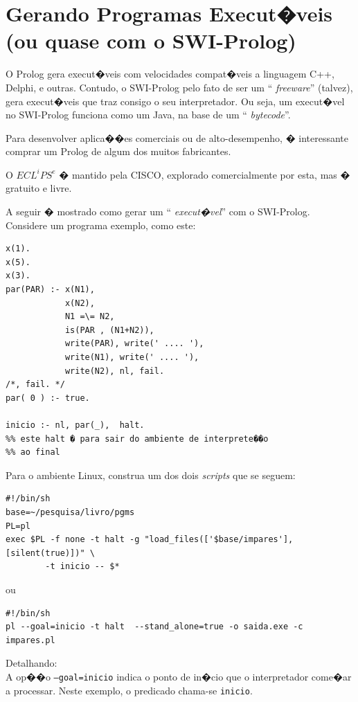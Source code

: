 \documentclass[final,a4paper]{article}
\begin{document}
\section{Gerando Programas Execut�veis (ou quase
com o SWI-Prolog)}

 O Prolog gera execut�veis com velocidades
compat�veis a linguagem C++, Delphi, e outras.
Contudo, o SWI-Prolog pelo fato de ser um ``{\em
freeware}'' (talvez), gera execut�veis que traz
consigo o seu interpretador. Ou seja, um
execut�vel no SWI-Prolog
funciona como um Java, na base de um ``{\em
bytecode}''. 


 Para desenvolver aplica��es
comerciais ou de alto-desempenho, � interessante comprar
um Prolog de algum dos muitos fabricantes.

 O $ECL^iPS^e$ � mantido pela CISCO, explorado
comercialmente por esta, mas � gratuito e livre.

\newpage
{} A seguir � mostrado como gerar um ``{\em
execut�vel}'' com o SWI-Prolog. Considere um
programa exemplo, como este:
\begin{verbatim}
x(1).
x(5).
x(3).
par(PAR) :- x(N1),
            x(N2),
            N1 =\= N2,
            is(PAR , (N1+N2)),
            write(PAR), write(' .... '), 
            write(N1), write(' .... '),
            write(N2), nl, fail.
/*, fail. */
par( 0 ) :- true.

inicio :- nl, par(_),  halt.
%% este halt � para sair do ambiente de interprete��o
%% ao final
\end{verbatim}

\newpage
Para o ambiente Linux, construa um dos dois {\em scripts} \/ que se seguem:
{\small
\begin{verbatim}
#!/bin/sh
base=~/pesquisa/livro/pgms
PL=pl
exec $PL -f none -t halt -g "load_files(['$base/impares'],[silent(true)])" \
        -t inicio -- $*
\end{verbatim}
}

ou

{\small
\begin{verbatim}
#!/bin/sh
pl --goal=inicio -t halt  --stand_alone=true -o saida.exe -c impares.pl
\end{verbatim}
}

Detalhando:\\
 A op��o {\tt --goal=inicio} indica o ponto de in�cio que o interpretador come�ar
a processar. Neste exemplo, o predicado chama-se {\tt inicio}.\\
\end{document}
